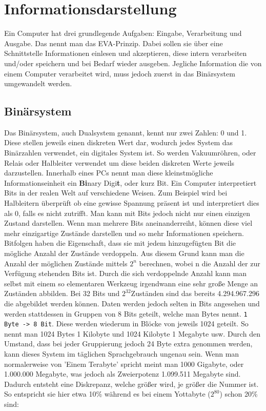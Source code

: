 \documentclass{article}
\begin{document}
	\section{Informationsdarstellung}
	Ein Computer hat drei grundlegende Aufgaben: Eingabe, Verarbeitung und Ausgabe. Das nennt man das EVA-Prinzip. Dabei sollen sie über eine Schnittstelle Informationen einlesen und akzeptieren, diese intern verarbeiten und/oder speichern und bei Bedarf wieder ausgeben. Jegliche Information die von einem Computer verarbeitet wird, muss jedoch zuerst in das Binärsystem umgewandelt werden.
	\subsection{Binärsystem}
	Das Binärsystem, auch Dualsystem genannt, kennt nur zwei Zahlen: 0 und 1. Diese stellen jeweils einen diskreten Wert dar, wodurch jedes System das Binärzahlen verwendet, ein digitales System ist. So werden Vakuumröhren, oder Relais oder Halbleiter verwendet um diese beiden diskreten Werte jeweils darzustellen. Innerhalb eines PCs nennt man diese kleinstmögliche Informationseinheit ein \textbf{Bi}nary Digi\textbf{t}, oder kurz Bit. Ein Computer interpretiert Bits in der realen Welt auf verschiedene Weisen. Zum Beispiel wird bei Halbleitern überprüft ob eine gewisse Spannung präsent ist und interpretiert dies als 0, falls es nicht zutrifft. Man kann mit Bits jedoch nicht nur einen einzigen Zustand darstellen. Wenn man mehrere Bits aneinanderreiht, können diese viel mehr einzigartige Zustände darstellen und so mehr Informationen speichern. Bitfolgen haben die Eigenschaft, dass sie mit jedem hinzugefügten Bit die mögliche Anzahl der Zustände verdoppeln. Aus diesem Grund kann man die Anzahl der möglichen Zustände mittels $2^n$ berechnen, wobei n die Anzahl der zur Verfügung stehenden Bits ist. Durch die sich verdoppelnde Anzahl kann man selbst mit einem so elementaren Werkzeug irgendwann eine sehr große Menge an Zuständen abbilden. Bei 32 Bits und $2^{32}$Zuständen sind das bereits 4.294.967.296 die abgebildet werden können. Daten werden jedoch selten in Bits angesehen und werden stattdessen in Gruppen von 8 Bits geteilt, welche man Bytes nennt. \verb|1 Byte -> 8 Bit|. Diese werden wiederum in Blöcke von jeweils 1024 geteilt. So nennt man 1024 Bytes 1 Kilobyte und 1024 Kilobyte 1 Megabyte usw. Durch den Umstand, dass bei jeder Gruppierung jedoch 24 Byte extra genommen werden, kann dieses System im täglichen Sprachgebrauch ungenau sein. Wenn man normalerweise von 'Einem Terabyte' spricht meint man 1000 Gigabyte, oder 1.000.000 Megabyte, was jedoch als Zweierpotenz 1.099.511 Megabyte sind. Dadurch entsteht eine Diskrepanz, welche größer wird, je größer die Nummer ist. So entspricht sie hier etwa 10\% während es bei einem Yottabyte ($2^{80}$) schon 20\% sind: \\
\end{document}
